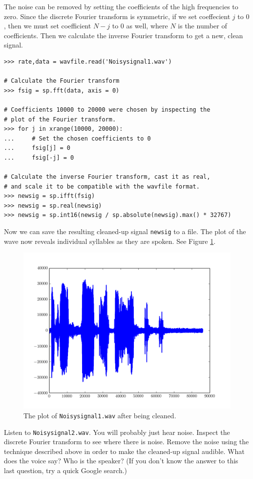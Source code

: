 The noise can be removed by setting the coefficients of the high frequencies to zero.
Since the discrete Fourier transform is symmetric, if we set coeffecient $j$ to $0$, then we must set coefficient $N - j$ to $0$ as well, where $N$ is the number of coefficients.
Then we calculate the inverse Fourier transform to get a new, clean signal.

\begin{lstlisting}
>>> rate,data = wavfile.read('Noisysignal1.wav')

# Calculate the Fourier transform
>>> fsig = sp.fft(data, axis = 0)

# Coefficients 10000 to 20000 were chosen by inspecting the
# plot of the Fourier transform.
>>> for j in xrange(10000, 20000):
...     # Set the chosen coefficients to 0
...     fsig[j] = 0
...     fsig[-j] = 0

# Calculate the inverse Fourier transform, cast it as real,
# and scale it to be compatible with the wavfile format.
>>> newsig = sp.ifft(fsig)
>>> newsig = sp.real(newsig)
>>> newsig = sp.int16(newsig / sp.absolute(newsig).max() * 32767)
\end{lstlisting}

Now we can save the resulting cleaned-up signal \texttt{newsig} to a  file.
The plot of the wave now reveals individual syllables as they are spoken.
See Figure \ref{fig:cleansignal}.

\begin{figure}[H]
    \centering
    \includegraphics[width=.7\textwidth]{figures/Cleanedsignal}
    \caption{The plot of \texttt{Noisysignal1.wav} after being cleaned.}
    \label{fig:cleansignal}
\end{figure}

\begin{problem} %
Listen to \texttt{Noisysignal2.wav}.
You will probably just hear noise.
Inspect the discrete Fourier transform to see where there is noise.
Remove the noise using the technique described above in order to make the cleaned-up signal audible.
What does the voice say?
Who is the speaker?
(If you don't know the answer to this last question, try a quick Google search.)
\end{problem}

